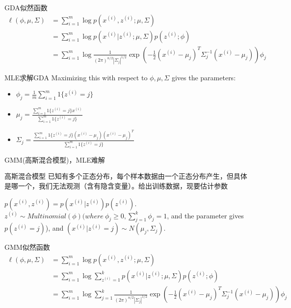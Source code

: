 \documentclass[noindent]{beamer}
\begin{document}
\begin{frame}
GDA似然函数
\begin{equation}
\begin{split}
    \ell(\phi,\mu,\Sigma) &= \sum_{i=1}^{m}  \log p(x^{(i)},z^{(i)}; \mu , \Sigma ) \\
              &= \sum_{i=1}^{m} \log  p(x^{(i)}|z^{(i)}; \mu , \Sigma ) p(z^{(i)}; \phi ) \\
              &= \sum_{i=1}^{m} \log   \frac{1}{(2\pi)^{n/2}| \Sigma _j|^{1/2}}\exp(-\frac{1}{2}(x^{(i)}-\mu_j)^T\Sigma_j^{-1}(x^{(i)}-\mu_j))\phi_j 
\end{split}
\end{equation}
\end{frame}
\begin{frame}{MLE求解GDA}
Maximizing this with respect to $\phi, \mu, \Sigma$ gives the parameters:

\begin{itemize}
\item $\phi_j =  \frac{1}{m} \sum_{i=1}^m 1\{z^{(i)}=j\}$
\item $\mu_j = \frac{\sum_{i=1}^m 1\{z^{(i)}=j\} x^{(i)}}{\sum_{i=1}^m1\{z^{(i)}=j\}}$
\item $\Sigma_j = \frac{\sum_{i=1}^m 1\{z^{(i)}=j\}(x^{(i)}-\mu_j)(x^{(i)}-\mu_j)^T
}{\sum_{i=1}^m 1\{z^{(i)}=j\}}$
\end{itemize}
\end{frame}
\begin{frame}{GMM(高斯混合模型)，MLE难解}
\begin{block}{高斯混合模型}
已知有多个正态分布，每个样本数据由一个正态分布产生，但具体是哪一个，我们无法观测（含有隐含变量）。给出训练数据，现要估计参数
\end{block}
$p(x^{(i)},z^{(i)}) = p(x^{(i)}|z^{(i)})p(z^{(i)})$.\\
 $z^{(i)} \sim Multinomial(\phi) (where \ \phi_j \geq 0,
\sum_{j=1}^k \phi_j = 1$, and the parameter gives $p(z^{(i)}=j)$), and $(x^{(i)}|z^{(i)}=j) \sim N(\mu_j,\Sigma_j)$.

\end{frame}

\begin{frame}
GMM似然函数
\begin{equation}
\begin{split}
   \ell(\phi,\mu,\Sigma)  &= \sum_{i=1}^{m}  \log p(x^{(i)},z^{(i)}; \mu , \Sigma ) \\
              &= \sum_{i=1}^{m} \log  \sum _{z^{(i)}=1}^{k} p(x^{(i)}|z^{(i)}; \mu , \Sigma ) p(z^{(i)}; \phi ) \\
              &= \sum_{i=1}^{m} \log  \sum _{j=1}^{k} \frac{1}{(2\pi)^{n/2}| \Sigma _j|^{1/2}} \exp(-\frac{1}{2}(x^{(i)}-\mu_j)^T\Sigma_j^{-1}(x^{(i)}-\mu_j))\phi_j 
\end{split}
\end{equation}
\end{frame}
\end{document}
